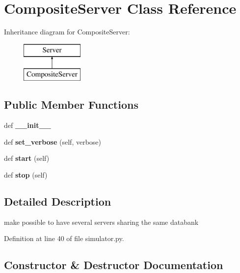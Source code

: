 \section{Composite\+Server Class Reference}
\label{classprotolibs_1_1modbus__tk_1_1simulator_1_1_composite_server}
Inheritance diagram for Composite\+Server\+:\begin{figure}[H]
\begin{center}
\leavevmode
\includegraphics[height=2.000000cm]{classprotolibs_1_1modbus__tk_1_1simulator_1_1_composite_server}
\end{center}
\end{figure}
\subsection*{Public Member Functions}
\begin{DoxyCompactItemize}
\item 
def {\bf \+\_\+\+\_\+init\+\_\+\+\_\+}
\item 
def {\bf set\+\_\+verbose} (self, verbose)
\item 
def {\bf start} (self)
\item 
def {\bf stop} (self)
\end{DoxyCompactItemize}


\subsection{Detailed Description}
\begin{DoxyVerb}make possible to have several servers sharing the same databank\end{DoxyVerb}
 

Definition at line 40 of file simulator.\+py.



\subsection{Constructor \& Destructor Documentation}
